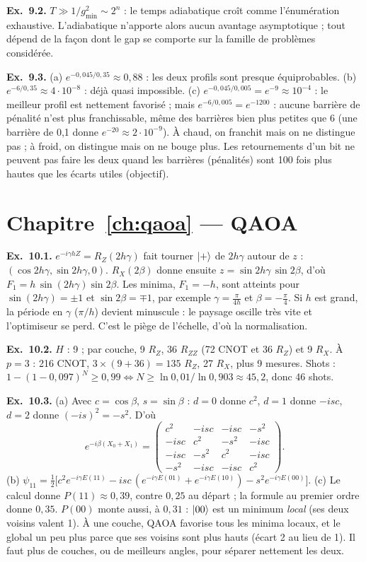 \textbf{Ex.~9.2.} $T\gg1/g_{\min}^2\sim2^n$ : le temps adiabatique croît comme l'énumération exhaustive. L'adiabatique n'apporte alors aucun avantage asymptotique ; tout dépend de la façon dont le gap se comporte sur la famille de problèmes considérée.

\textbf{Ex.~9.3.} (a) $e^{-0{,}045/0{,}35}\approx0{,}88$ : les deux profils sont presque équiprobables. (b) $e^{-6/0{,}35}\approx4\cdot10^{-8}$ : déjà quasi impossible. (c) $e^{-0{,}045/0{,}005}=e^{-9}\approx10^{-4}$ : le meilleur profil est nettement favorisé ; mais $e^{-6/0{,}005}=e^{-1200}$ : aucune barrière de pénalité n'est plus franchissable, même des barrières bien plus petites que 6 (une barrière de 0,1 donne $e^{-20}\approx2\cdot10^{-9}$). À chaud, on franchit mais on ne distingue pas ; à froid, on distingue mais on ne bouge plus. Les retournements d'un bit ne peuvent pas faire les deux quand les barrières (pénalités) sont 100 fois plus hautes que les écarts utiles (objectif).

\section*{Chapitre~\ref{ch:qaoa} — QAOA}
\textbf{Ex.~10.1.} $e^{-i\gamma hZ}=R_Z(2h\gamma)$ fait tourner $\lvert +\rangle$ de $2h\gamma$ autour de $z$ : $(\cos2h\gamma,\sin2h\gamma,0)$. $R_X(2\beta)$ donne ensuite $z=\sin2h\gamma\,\sin2\beta$, d'où $F_1=h\,\sin(2h\gamma)\sin2\beta$. Les minima, $F_1=-h$, sont atteints pour $\sin(2h\gamma)=\pm1$ et $\sin2\beta=\mp1$, par exemple $\gamma=\tfrac{\pi}{4h}$ et $\beta=-\tfrac\pi4$. Si $h$ est grand, la période en $\gamma$ ($\pi/h$) devient minuscule : le paysage oscille très vite et l'optimiseur se perd. C'est le piège de l'échelle, d'où la normalisation.

\textbf{Ex.~10.2.} $H$ : 9 ; par couche, 9 $R_Z$, 36 $R_{ZZ}$ (72 CNOT et 36 $R_Z$) et 9 $R_X$. À $p=3$ : 216 CNOT, $3\times(9+36)=135$ $R_Z$, 27 $R_X$, plus 9 mesures. Shots : $1-(1-0{,}097)^N\ge0{,}99\Leftrightarrow N\ge\ln0{,}01/\ln0{,}903\approx45{,}2$, donc 46 shots.

\textbf{Ex.~10.3.} (a) Avec $c=\cos\beta$, $s=\sin\beta$ : $d=0$ donne $c^2$, $d=1$ donne $-isc$, $d=2$ donne $(-is)^2=-s^2$. D'où
\[ e^{-i\beta(X_0+X_1)}=\begin{pmatrix}c^2&-isc&-isc&-s^2\\-isc&c^2&-s^2&-isc\\-isc&-s^2&c^2&-isc\\-s^2&-isc&-isc&c^2\end{pmatrix}. \]
(b) $\psi_{11}=\tfrac12\big[c^2e^{-i\gamma E(11)}-isc\,(e^{-i\gamma E(01)}+e^{-i\gamma E(10)})-s^2e^{-i\gamma E(00)}\big]$. (c) Le calcul donne $P(11)\approx0{,}39$, contre $0{,}25$ au départ ; la formule au premier ordre donne $0{,}35$. $P(00)$ monte aussi, à $0{,}31$ : $\lvert 00\rangle$ est un minimum \emph{local} (ses deux voisins valent 1). À une couche, QAOA favorise tous les minima locaux, et le global un peu plus parce que ses voisins sont plus hauts (écart 2 au lieu de 1). Il faut plus de couches, ou de meilleurs angles, pour séparer nettement les deux.


